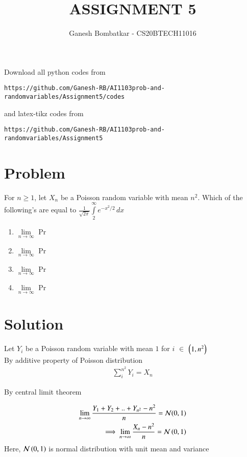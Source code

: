 \documentclass[journal,12pt,twocolumn]{IEEEtran}
\begin{document}
\title{ASSIGNMENT 5}
\author{Ganesh Bombatkar - CS20BTECH11016}
\maketitle
\newpage
\bigskip
\renewcommand{\thefigure}{\theenumi}
\renewcommand{\thetable}{\theenumi}
Download all python codes from 
\begin{lstlisting}
https://github.com/Ganesh-RB/AI1103prob-and-randomvariables/Assignment5/codes
\end{lstlisting}
%
and latex-tikz codes from 
%
\begin{lstlisting}
https://github.com/Ganesh-RB/AI1103prob-and-randomvariables/Assignment5
\end{lstlisting}
\section{Problem}
For $n \geq 1$, let $X_n$ be a Poisson random  variable with mean $n^2$.
 Which of the following's are equal to
 $\displaystyle{\frac{1}{\sqrt{2\pi}} \int \limits_2^{\infty} e^{-x^2/2}\,dx}$
\begin{enumerate}
    \item $\lim \limits_{n \to \infty} $ Pr\,
    \item $\lim \limits_{n \to \infty} $ Pr\,
    \item $\lim \limits_{n \to \infty} $ Pr\,
    \item $\lim \limits_{n \to \infty} $ Pr\,
\end{enumerate}


\section{Solution}
Let $Y_i$ be a Poisson random variable with mean $1$ for $i$ $\in$ $\left(1,n^2\right)$
\\[2ex]By additive property of Poisson distribution
\begin{align}
   { \sum \limits_{i}^{n^2} Y_i = X_n   }  
\end{align}

By central limit theorem 

\begin{align}
    \lim  \limits_{n \to \infty} \frac{Y_1+Y_2+..+Y_{n^2} - n^2}{n} = \mathcal{N}(0,1)
    \\ \implies \lim  \limits_{n\to \infty} \frac{X_n-n^2}{n} = \mathcal{N}\left(0,1\right)
\end{align}
Here, $\mathcal{N}\left(0,1\right)$ is normal distribution with unit mean and variance
\end{document}

